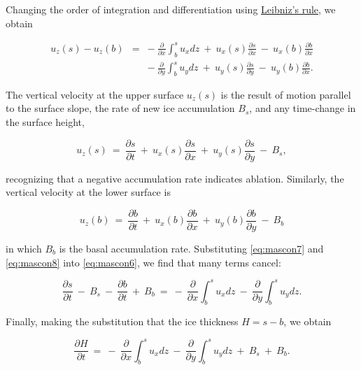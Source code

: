 \noindent
Changing the order of integration and differentiation using 
\href{http://en.wikipedia.org/wiki/Leibniz_integral_rule}{Leibniz's rule}, we obtain

\begin{equation}
\begin{matrix}
u_{z} \left(s\right)-u_{z} \left(b\right) & = & -~\frac{\partial}{\partial x} \int_{b}^{s} u_{x} dz ~ +~u_{x}(s)\frac{\partial s}{\partial x} ~-~ u_{x}(b)\frac{\partial b}{\partial x}  \\ 
& & -~\frac{\partial}{\partial y}\int_{b}^{s} u_{y} dz   ~ +~u_{y}(s)\frac{\partial s}{\partial y} ~-~ u_{y}(b)\frac{\partial b}{\partial x}.
\end{matrix}
\label{eq:mascon6}
\end{equation}

The vertical velocity at the upper surface $u_{z}(s)$ is the result of motion parallel to the surface slope, 
the rate of new ice accumulation $B_s$, and any time-change in the surface height,

\begin{equation}
u_{z} \left(s\right)~=~\frac{\partial s}{\partial t}~+~u_{x}(s)\frac{\partial s}{\partial x}~+~u_{y}(s)\frac{\partial s}{\partial y}~-~B_s, 
\label{eq:mascon7}
\end{equation}

\noindent
recognizing that a negative accumulation rate indicates ablation. Similarly, the vertical velocity at the lower surface is

\begin{equation}
u_{z} \left(b\right)~=~\frac{\partial b}{\partial t}~+~u_{x}(b)\frac{\partial b}{\partial x}~+~u_{y}(b)\frac{\partial b}{\partial y}~-~B_b
\label{eq:mascon8}
\end{equation}

\noindent
in which $B_b$ is the basal accumulation rate.
Substituting \eqref{eq:mascon7} and \eqref{eq:mascon8} into \eqref{eq:mascon6}, we find that many terms cancel:

\begin{equation}
\frac{\partial s}{\partial t}~-~B_s~-~\frac{\partial b}{\partial t}~+~B_b~=~-~\frac{\partial}{\partial x} \int_{b}^{s} u_{x} dz~-~\frac{\partial}{\partial y} \int_{b}^{s} u_{y} dz.
\label{eq:mascon9}
\end{equation}

\noindent
Finally, making the substitution that the ice thickness $H=s-b$, we obtain

\begin{equation}
\frac{\partial H}{\partial t}~=~-~\frac{\partial}{\partial x} \int_{b}^{s} u_{x} dz~-~\frac{\partial}{\partial y} \int_{b}^{s} u_{y} dz ~+~B_s~+~B_b.
\label{eq:mascon10}
\end{equation}


